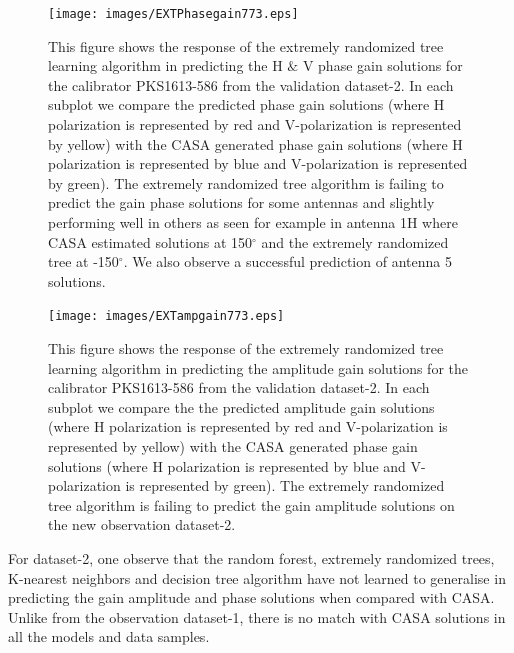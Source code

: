 \begin{figure}[H]
    \texttt{[image: images/EXTPhasegain773.eps]}
    \caption{This figure shows the response of the extremely randomized tree learning algorithm in predicting the H $\&$ V phase gain solutions for the calibrator PKS1613-586 from the validation dataset-2. In each subplot we compare the predicted phase gain solutions (where H polarization is represented by red and V-polarization is represented by yellow) with the CASA generated phase gain solutions (where H polarization is represented by blue and V-polarization is represented by green). The extremely randomized tree algorithm is failing to predict the gain phase solutions for some antennas and slightly performing well in others as seen for example in antenna 1H where CASA estimated solutions at 150$^\circ$ and the extremely randomized tree at -150$^\circ$. We also observe a successful prediction of antenna 5 solutions.}
    \label{obs12}
\end{figure}

\begin{figure}[H]
    \texttt{[image: images/EXTampgain773.eps]}
    \caption{This figure shows the response of the extremely randomized tree learning algorithm in predicting the amplitude gain solutions for the calibrator PKS1613-586 from the validation dataset-2. In each subplot we compare the the predicted amplitude gain solutions (where H polarization is represented by red and V-polarization is represented by yellow) with the CASA generated phase gain solutions (where H polarization is represented by blue and V-polarization is represented by green). The extremely randomized tree algorithm is failing to predict the gain amplitude solutions on the new observation dataset-2.}
     \label{ea3}
\end{figure}

For dataset-2, one observe that the random forest, extremely randomized trees, K-nearest neighbors and decision tree algorithm have not learned to generalise in predicting the gain amplitude and phase solutions when compared with CASA. Unlike from the observation dataset-1, there is no match with CASA solutions in all the models and data samples. 








